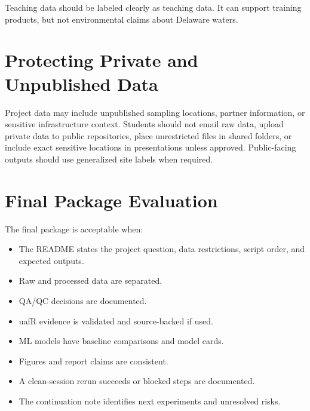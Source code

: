 Teaching data should be labeled clearly as teaching data. It can support training products, but not environmental claims about Delaware waters.

\section{Protecting Private and Unpublished Data}

Project data may include unpublished sampling locations, partner information, or sensitive infrastructure context. Students should not email raw data, upload private data to public repositories, place unrestricted files in shared folders, or include exact sensitive locations in presentations unless approved. Public-facing outputs should use generalized site labels when required.

\section{Final Package Evaluation}

The final package is acceptable when:
\begin{itemize}
  \item The README states the project question, data restrictions, script order, and expected outputs.
  \item Raw and processed data are separated.
  \item QA/QC decisions are documented.
  \item uafR evidence is validated and source-backed if used.
  \item ML models have baseline comparisons and model cards.
  \item Figures and report claims are consistent.
  \item A clean-session rerun succeeds or blocked steps are documented.
  \item The continuation note identifies next experiments and unresolved risks.
\end{itemize}
